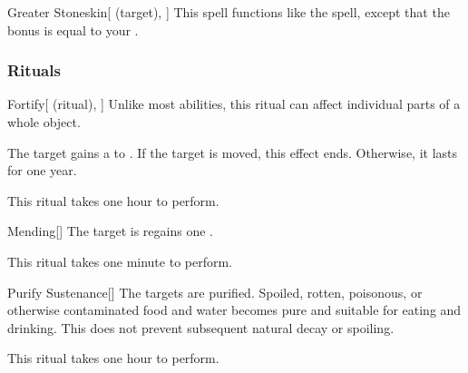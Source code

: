 \lowercase{\hypertarget{spell:Greater Stoneskin}{}}\label{spell:Greater Stoneskin}
\begin{attuneability}[\nth{7}]{\hypertarget{spell:Greater Stoneskin}{Greater Stoneskin}}[ (target), ]
This spell functions like the  spell, except that the bonus is equal to your .
\end{attuneability}
\vspace{0.25em}



\subsubsection{Rituals}


\lowercase{\hypertarget{spell:Fortify}{}}\label{spell:Fortify}
\begin{attuneability}[\nth{1}]{\hypertarget{spell:Fortify}{Fortify}}[ (ritual), ]
Unlike most abilities, this ritual can affect individual parts of a whole object.

The target gains a   to .
If the target is moved, this effect ends.
Otherwise, it lasts for one year.

This ritual takes one hour to perform.
\end{attuneability}
\vspace{0.25em}



\lowercase{\hypertarget{spell:Mending}{}}\label{spell:Mending}
\begin{apability}[\nth{1}]{\hypertarget{spell:Mending}{Mending}}[]
The target is regains one .

This ritual takes one minute to perform.
\end{apability}
\vspace{0.25em}



\lowercase{\hypertarget{spell:Purify Sustenance}{}}\label{spell:Purify Sustenance}
\begin{apability}[\nth{1}]{\hypertarget{spell:Purify Sustenance}{Purify Sustenance}}[]
The targets are purified.
Spoiled, rotten, poisonous, or otherwise contaminated food and water becomes pure and suitable for eating and drinking.
This does not prevent subsequent natural decay or spoiling.

This ritual takes one hour to perform.
\end{apability}
\vspace{0.25em}



